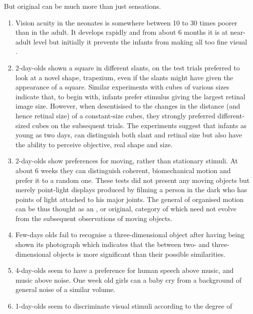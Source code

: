 \label{sub:psychexa}
But original  can be much more than just sensations.

\begin{enumerate}\MyLPar
\item Vision acuity in the neonates is somewhere between 10 to 30 times poorer
  than in the adult. It develops rapidly and from about 6
  months it is at near-adult level but initially it prevents the infants from
  making all too fine visual .
\item 2-day-olds shown a square in different slants, on the test trials
  preferred to look at a novel shape, trapezium, even if the slants might have
  given the appearance of a square. Similar experiments with
  cubes of various sizes indicate that, to begin with, infants prefer stimulus
  giving the largest retinal image size. However, when desentisised to the
  changes in the distance (and hence retinal size) of a constant-size cubes,
  they strongly preferred different-sized cubes on the subsequent trials. The
  experiments suggest that infants as young as two days, can distinguish both
  slant and retinal size but also have the ability to perceive objective, real
  shape and size.
\item 2-day-olds show preferences for moving, rather than stationary stimuli. At
  about 6 weeks they can distinguish coherent, biomechanical motion and prefer
  it to a random one. These tests did not present any moving objects but merely
  point-light displays produced by filming a person in the dark who has points
  of light attached to his major joints. The general
   of organised motion can be thus thought as an ,
  or original, 
  category of  which need not evolve from the subsequent
  observations of moving objects.
\item Few-days olds fail to recognise a three-dimensional object after having
  being shown its photograph which indicates that the  between
  two- and three-dimensional objects is more significant than their possible
  similarities.
\item 4-day-olds seem to have a preference for human speech above music, and
  music above noise. One week old girls can
   a baby cry from a background of general noise of a similar
  volume.
\item 1-day-olds seem to discriminate visual stimuli according to the degree of

\end{enumerate}
